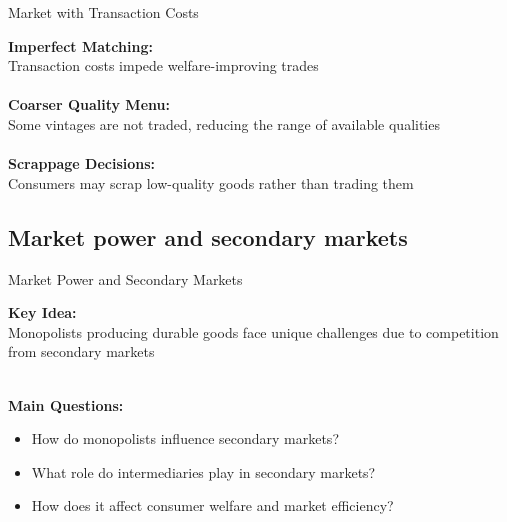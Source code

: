 \documentclass[aspectratio=169]{beamer}  %
\begin{document}
\begin{frame}{Market with Transaction Costs }{}
\begin{spacing}{1.5}
{\small
    \textbf{Imperfect Matching:} \\
    Transaction costs impede welfare-improving trades\\
     \quad\\
    \textbf{Coarser Quality Menu:}\\
    Some vintages are not traded, reducing the range of available qualities \\
    \quad\\
    \textbf{Scrappage Decisions:}\\
    Consumers may scrap low-quality goods rather than trading them \\
    }
\end{spacing}
\end{frame}



\subsection{Market power and secondary markets}



\begin{frame}{Market Power and Secondary Markets }{}
\begin{spacing}{1.5}
{\small
    \textbf{Key Idea:}\\
    Monopolists producing durable goods face unique challenges due to competition from secondary markets\\
\quad\\
 {\small   \textbf{Main Questions:}
    \begin{itemize}
        \item How do monopolists influence secondary markets?
        \item What role do intermediaries play   in secondary markets?
        \item How does it affect consumer welfare and market efficiency?
    \end{itemize}}

    }
\end{spacing}
\end{frame}
\end{document}

